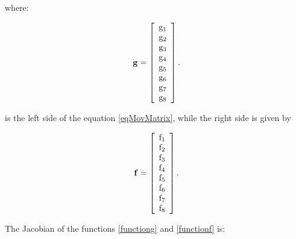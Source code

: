 \documentclass[sublist,a4paper,twoside,11pt]{article}
\begin{document}
where:

\begin{equation} \label{functiong}
    {\bf g} = \left[ \begin{array}{c} {\rm g}_1 \\ {\rm g}_2 \\ {\rm g}_3 \\ {\rm g}_4 \\ {\rm g}_5 \\ {\rm g}_6 \\ {\rm g}_7 \\ {\rm g}_8 \end{array} \right].
\end{equation}

is the left side of the equation \eqref{eqMovMatrix}, while the right side is given by

\begin{equation} \label{functionf}
    {\bf f} = \left[ \begin{array}{c} {\rm f}_1 \\ {\rm f}_2 \\ {\rm f}_3 \\ {\rm f}_4 \\ {\rm f}_5 \\ {\rm f}_6 \\ {\rm f}_7 \\ {\rm f}_8 \end{array} \right].
\end{equation}

The Jacobian of the functions \eqref{functiong} and \eqref{functionf} is:
\end{document}
